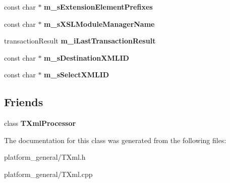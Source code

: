 \begin{DoxyCompactItemize}
\item 
\hypertarget{classgeneral__server_1_1TXml_a7ccdbed30537ccb85715f2ebbc0475ab}{const char $\ast$ {\bfseries m\-\_\-s\-Extension\-Element\-Prefixes}}\label{classgeneral__server_1_1TXml_a7ccdbed30537ccb85715f2ebbc0475ab}

\item 
\hypertarget{classgeneral__server_1_1TXml_af9e643d02b16d8d19325fbfad5b98ceb}{const char $\ast$ {\bfseries m\-\_\-s\-X\-S\-L\-Module\-Manager\-Name}}\label{classgeneral__server_1_1TXml_af9e643d02b16d8d19325fbfad5b98ceb}

\item 
\hypertarget{classgeneral__server_1_1TXml_a1c189b6514a00342196591c3207384cb}{transaction\-Result {\bfseries m\-\_\-i\-Last\-Transaction\-Result}}\label{classgeneral__server_1_1TXml_a1c189b6514a00342196591c3207384cb}

\item 
\hypertarget{classgeneral__server_1_1TXml_af7f74273598bab722cd367af359e0577}{const char $\ast$ {\bfseries m\-\_\-s\-Destination\-X\-M\-L\-I\-D}}\label{classgeneral__server_1_1TXml_af7f74273598bab722cd367af359e0577}

\item 
\hypertarget{classgeneral__server_1_1TXml_a510736cf73b0e477eae576897df607f1}{const char $\ast$ {\bfseries m\-\_\-s\-Select\-X\-M\-L\-I\-D}}\label{classgeneral__server_1_1TXml_a510736cf73b0e477eae576897df607f1}

\end{DoxyCompactItemize}
\subsection*{\-Friends}
\begin{DoxyCompactItemize}
\item 
\hypertarget{classgeneral__server_1_1TXml_abfcbf3d0beb2e47cb84990301974ba77}{class {\bfseries \-T\-Xml\-Processor}}\label{classgeneral__server_1_1TXml_abfcbf3d0beb2e47cb84990301974ba77}

\end{DoxyCompactItemize}


\-The documentation for this class was generated from the following files\-:\begin{DoxyCompactItemize}
\item 
platform\-\_\-general/\-T\-Xml.\-h\item 
platform\-\_\-general/\-T\-Xml.\-cpp\end{DoxyCompactItemize}
